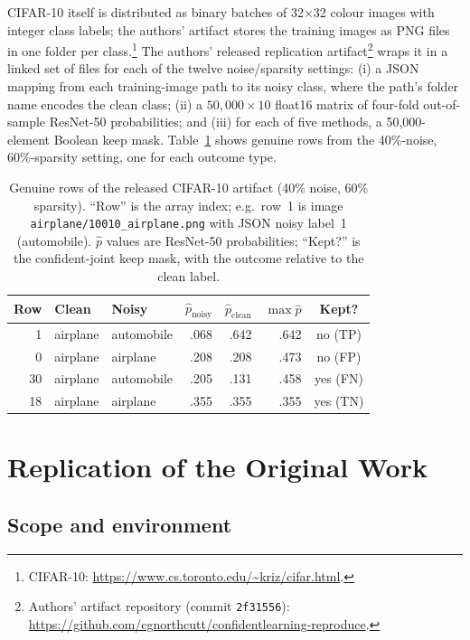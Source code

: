 \documentclass[11pt]{article}
\begin{document}
CIFAR-10 itself is distributed as binary batches of 32$\times$32 colour images
with integer class labels; the authors' artifact stores the training images as
PNG files in one folder per class.\footnote{CIFAR-10:
\url{https://www.cs.toronto.edu/~kriz/cifar.html}.} The authors' released
replication artifact\footnote{Authors' artifact repository (commit
\texttt{2f31556}):
\url{https://github.com/cgnorthcutt/confidentlearning-reproduce}.} wraps it
in a linked set of files for each of the twelve noise/sparsity settings: (i)
a JSON mapping from each training-image path to its noisy class, where the
path's folder name encodes the clean class; (ii) a $50{,}000\times10$ float16
matrix of four-fold out-of-sample ResNet-50 probabilities; and (iii) for each
of five methods, a 50,000-element Boolean keep mask. Table~\ref{tab:orig-snippet}
shows genuine rows from the 40\%-noise, 60\%-sparsity setting, one for each
outcome type.

\begin{table}[t]
\centering
\small
\setlength{\tabcolsep}{2.4pt}
\begin{tabular}{rllrrrc}
\toprule
\textbf{Row} & \textbf{Clean} & \textbf{Noisy} & \textbf{$\hat{p}_{\text{noisy}}$} & \textbf{$\hat{p}_{\text{clean}}$} & \textbf{$\max\hat{p}$} & \textbf{Kept?} \\
\midrule
1 & airplane & automobile & .068 & .642 & .642 & no (TP) \\
0 & airplane & airplane & .208 & .208 & .473 & no (FP) \\
30 & airplane & automobile & .205 & .131 & .458 & yes (FN) \\
18 & airplane & airplane & .355 & .355 & .355 & yes (TN) \\
\bottomrule
\end{tabular}
\caption{Genuine rows of the released CIFAR-10 artifact (40\% noise, 60\%
sparsity). ``Row'' is the array index; e.g.\ row~1 is image
\texttt{airplane/10010\_airplane.png} with JSON noisy label~1 (automobile).
$\hat{p}$ values are ResNet-50 probabilities; ``Kept?'' is the confident-joint
keep mask, with the outcome relative to the clean label.}
\label{tab:orig-snippet}
\end{table}

\section{Replication of the Original Work}
\label{sec:replication}

\subsection{Scope and environment}
\end{document}
